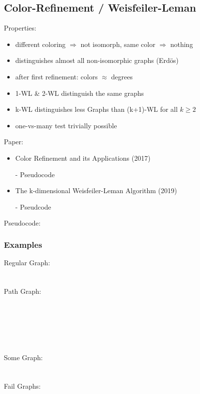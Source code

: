 \subsection{Color-Refinement / Weisfeiler-Leman}


Properties:
\begin{itemize}
    \item different coloring $\Rightarrow$ not isomorph, same color $\Rightarrow$ nothing
    \item distinguishes almost all non-isomorphic graphs (Erdös)
    \item after first refinement: colors $\approx$ degrees
    \item 1-WL \& 2-WL distinguish the same graphs
    \item k-WL distinguishes less Graphs than (k+1)-WL for all $k\geq 2$
    \item one-vs-many test trivially possible
\end{itemize}

\vspace*{.5cm}
\noindent
Paper:
\begin{itemize}
    \item Color Refinement and its Applications (2017)
    \item[-] Pseudocode
    \item The k-dimensional Weisfeiler-Leman Algorithm (2019)
    \item[-] Pseudcode
\end{itemize}

\vspace*{.5cm}
\noindent 
Pseudocode:


\subsubsection{Examples}
Regular Graph:\\
\\\\
Path Graph:\\
\\
\\
\\
\\
\\\\
Some Graph:\\


\\\\
Fail Graphs:\\

\\